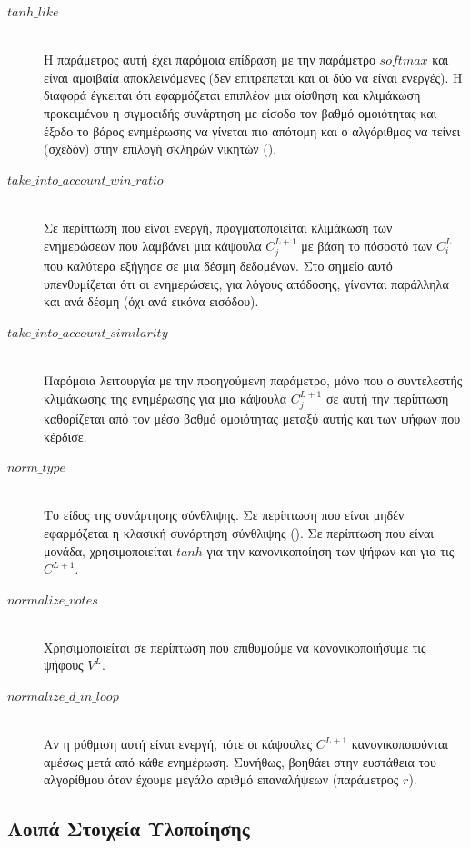 \begin{description}
  \item[$tanh\_like$] \hfill \\ Η παράμετρος αυτή έχει παρόμοια επίδραση με την παράμετρο $softmax$ και είναι αμοιβαία αποκλεινόμενες (δεν επιτρέπεται και οι δύο να είναι ενεργές). Η διαφορά έγκειται ότι εφαρμόζεται επιπλέον μια οίσθηση και κλιμάκωση προκειμένου η σιγμοειδής συνάρτηση με είσοδο τον βαθμό ομοιότητας και έξοδο το βάρος ενημέρωσης να γίνεται πιο απότομη και ο αλγόριθμος να τείνει (σχεδόν) στην επιλογή σκληρών νικητών ().
  \item[$take\_into\_account\_win\_ratio$] \hfill \\ Σε περίπτωση που είναι ενεργή, πραγματοποιείται κλιμάκωση των ενημερώσεων που λαμβάνει μια κάψουλα $C^{L+1}_j$ με βάση το πόσοστό των $C^L_i$ που καλύτερα εξήγησε σε μια δέσμη δεδομένων. Στο σημείο αυτό υπενθυμίζεται ότι οι ενημερώσεις, για λόγους απόδοσης, γίνονται παράλληλα και ανά δέσμη (όχι ανά εικόνα εισόδου).
  \item[$take\_into\_account\_similarity$] \hfill \\ Παρόμοια λειτουργία με την προηγούμενη παράμετρο, μόνο που ο συντελεστής κλιμάκωσης της ενημέρωσης για μια κάψουλα $C_j^{L+1}$ σε αυτή την περίπτωση καθορίζεται από τον μέσο βαθμό ομοιότητας μεταξύ αυτής και των ψήφων που κέρδισε.
  \item[$norm\_type$] \hfill \\ Το είδος της συνάρτησης σύνθλιψης. Σε περίπτωση που είναι μηδέν εφαρμόζεται η κλασική συνάρτηση σύνθλιψης (). Σε περίπτωση που είναι μονάδα, χρησιμοποιείται $tanh$  για την κανονικοποίηση των ψήφων και  για τις $C^{L+1}$.
  \item[$normalize\_votes$] \hfill \\ Χρησιμοποιείται σε περίπτωση που επιθυμούμε να κανονικοποιήσυμε τις ψήφους $V^L$.
  \item[$normalize\_d\_in\_loop$] \hfill \\ Αν η ρύθμιση αυτή είναι ενεργή, τότε οι κάψουλες $C^{L+1}$ κανονικοποιούνται αμέσως μετά από κάθε ενημέρωση. Συνήθως, βοηθάει στην ευστάθεια του αλγορίθμου όταν έχουμε μεγάλο αριθμό επαναλήψεων (παράμετρος $r$).
\end{description}

\subsection{Λοιπά Στοιχεία Υλοποίησης}